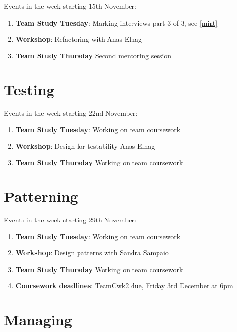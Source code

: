 \documentclass[
]{book}
\providecommand{\tightlist}{%
  \setlength{\itemsep}{0pt}\setlength{\parskip}{0pt}}
\begin{document}
Events in the week starting 15th November:

\begin{enumerate}
\def\labelenumi{\arabic{enumi}.}
\tightlist
\item
  \textbf{Team Study Tuesday}: Marking interviews part 3 of 3, see \ref{mint}
\item
  \textbf{Workshop}: Refactoring with Anas Elhag
\item
  \textbf{Team Study Thursday} Second mentoring session
\end{enumerate}

\hypertarget{week9}{%
\section{Testing}\label{week9}}

Events in the week starting 22nd November:

\begin{enumerate}
\def\labelenumi{\arabic{enumi}.}
\tightlist
\item
  \textbf{Team Study Tuesday}: Working on team coursework
\item
  \textbf{Workshop}: Design for testability Anas Elhag
\item
  \textbf{Team Study Thursday} Working on team coursework
\end{enumerate}

\hypertarget{week10}{%
\section{Patterning}\label{week10}}

Events in the week starting 29th November:

\begin{enumerate}
\def\labelenumi{\arabic{enumi}.}
\tightlist
\item
  \textbf{Team Study Tuesday}: Working on team coursework
\item
  \textbf{Workshop}: Design patterns with Sandra Sampaio
\item
  \textbf{Team Study Thursday} Working on team coursework
\item
  \textbf{Coursework deadlines}: TeamCwk2 due, Friday 3rd December at 6pm
\end{enumerate}

\hypertarget{week11}{%
\section{Managing}\label{week11}}
\end{document}

